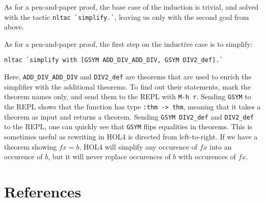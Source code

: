 \documentclass[10pt]{scrartcl}
\newcommand{\ekey}[1]{\texttt{#1}}
\begin{document}
As for a pen-and-paper proof, the base case of the induction is trivial, and
solved with the tactic \lstinline{nltac `simplify.`}, leaving us only with the
second goal from above.

As for a pen-and-paper proof, the first step on the inductive case is to
simplify:
\begin{lstlisting}
nltac `simplify with [GSYM ADD_DIV_ADD_DIV, GSYM DIV2_def].`
\end{lstlisting}

Here, \lstinline{ADD_DIV_ADD_DIV} and \lstinline{DIV2_def} are theorems that are
used to enrich the simplifier with the additional theorems.
To find out their statements, mark the theorem names only, and send them to the
REPL with \ekey{M-h r}.
Sending \lstinline{GSYM} to the REPL shows that the function has type
\lstinline{:thm -> thm}, meaning that it takes a theorem as input and returns a
theorem.
Sending \lstinline{GSYM DIV2_def} and \lstinline{DIV2_def} to the REPL, one can
quickly see that \lstinline{GSYM} flips equalities in theorems.
This is sometimes useful as rewriting in HOL4 is directed from left-to-right.
If we have a theorem showing $f x = b$, HOL4 will simplify any occurence of
$f x$ into an occurence of $b$, but it will never replace occurences of $b$
with occurences of $f x$.


\section{References}
\printbibliography
\end{document}
